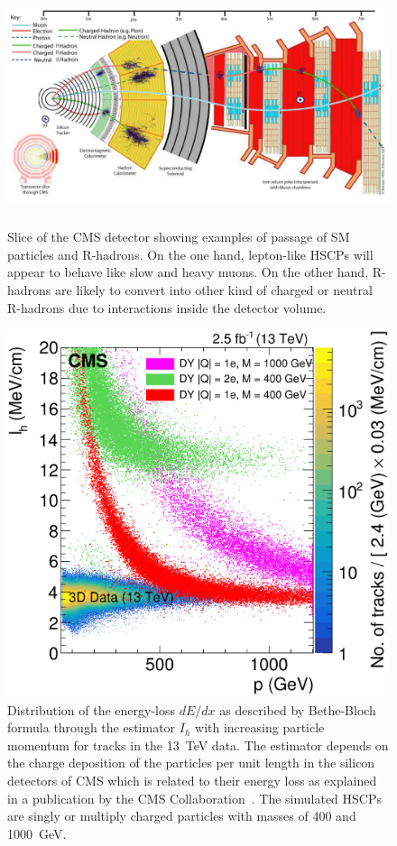 \endgroup

	\begin{figure}[H]
		\centering
		\includegraphics[height=7cm]{fig/chapt3/CMS-slice-HSCPs.png}
		\caption{\label{fig:HSCPs} Slice of the CMS detector showing examples of passage of SM particles and R-hadrons. On the one hand, lepton-like HSCPs will appear to behave like slow and heavy muons. On the other hand, R-hadrons are likely to convert into other kind of charged or neutral R-hadrons due to interactions inside the detector volume.}
	\end{figure}
	
\begingroup\setlength{\intextsep}{5pt}\setlength{\columnsep}{15pt}
	
	\begin{figure}
		\centering
		\includegraphics[width=\linewidth]{fig/chapt3/HSCPs_dEdx_CMS.png}
		\caption{\label{fig:dEdx-HSCPs} Distribution of the energy-loss $dE/dx$ as described by Bethe-Bloch formula through the estimator $I_h$ with increasing particle momentum for tracks in the \SI{13}{TeV} data. The estimator depends on the charge deposition of the particles per unit length in the silicon detectors of CMS which is related to their energy loss as explained in a publication by the CMS Collaboration~\cite{CMSHSCP2016}. The simulated HSCPs are singly or multiply charged particles with masses of 400 and \SI{1000}{GeV}.}
	\end{figure}
	
